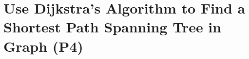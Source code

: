 \documentclass[12pt, a4paper, twoside]{report} %
\begin{document}

\section{Use Dijkstra’s Algorithm to Find a Shortest Path Spanning Tree in Graph (P4)}
\label{sec:P4}


\end{document}

